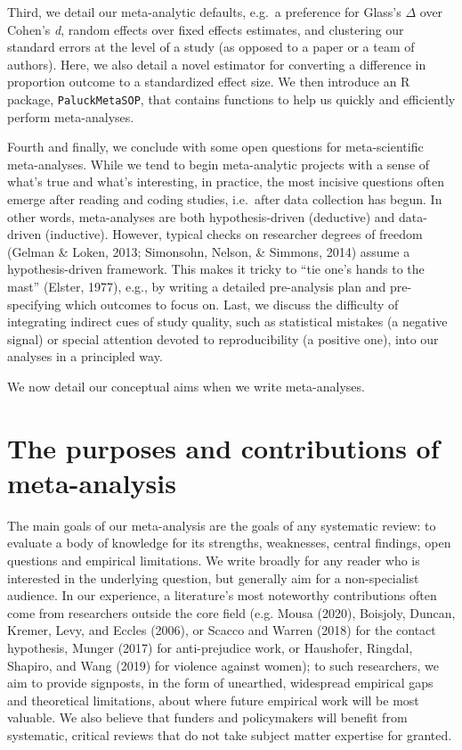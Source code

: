 \documentclass[
  ,jou]{apa6}
\begin{document}
Third, we detail our meta-analytic defaults, e.g.~a preference for Glass's \(\Delta\) over Cohen's \emph{d}, random effects over fixed effects estimates, and clustering our standard errors at the level of a study (as opposed to a paper or a team of authors). Here, we also detail a novel estimator for converting a difference in proportion outcome to a standardized effect size. We then introduce an R package, \texttt{PaluckMetaSOP}, that contains functions to help us quickly and efficiently perform meta-analyses.

Fourth and finally, we conclude with some open questions for meta-scientific meta-analyses. While we tend to begin meta-analytic projects with a sense of what's true and what's interesting, in practice, the most incisive questions often emerge after reading and coding studies, i.e.~after data collection has begun. In other words, meta-analyses are both hypothesis-driven (deductive) and data-driven (inductive). However, typical checks on researcher degrees of freedom (Gelman \& Loken, 2013; Simonsohn, Nelson, \& Simmons, 2014) assume a hypothesis-driven framework. This makes it tricky to ``tie one's hands to the mast'' (Elster, 1977), e.g., by writing a detailed pre-analysis plan and pre-specifying which outcomes to focus on. Last, we discuss the difficulty of integrating indirect cues of study quality, such as statistical mistakes (a negative signal) or special attention devoted to reproducibility (a positive one), into our analyses in a principled way.

We now detail our conceptual aims when we write meta-analyses.

\section{The purposes and contributions of meta-analysis}\label{the-purposes-and-contributions-of-meta-analysis}

The main goals of our meta-analysis are the goals of any systematic review: to evaluate a body of knowledge for its strengths, weaknesses, central findings, open questions and empirical limitations. We write broadly for any reader who is interested in the underlying question, but generally aim for a non-specialist audience. In our experience, a literature's most noteworthy contributions often come from researchers outside the core field (e.g. Mousa (2020), Boisjoly, Duncan, Kremer, Levy, and Eccles (2006), or Scacco and Warren (2018) for the contact hypothesis, Munger (2017) for anti-prejudice work, or Haushofer, Ringdal, Shapiro, and Wang (2019) for violence against women); to such researchers, we aim to provide signposts, in the form of unearthed, widespread empirical gaps and theoretical limitations, about where future empirical work will be most valuable. We also believe that funders and policymakers will benefit from systematic, critical reviews that do not take subject matter expertise for granted.
\end{document}
